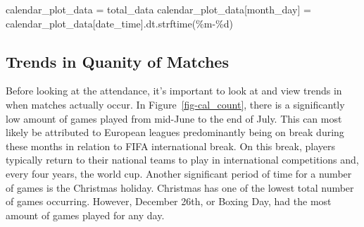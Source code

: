 \documentclass[
  letterpaper,
  DIV=11,
  numbers=noendperiod]{scrartcl}
\newenvironment{Shaded}{\begin{snugshade}}{\end{snugshade}}
\newcommand{\NormalTok}[1]{\textcolor[rgb]{0.00,0.23,0.31}{#1}}
\newcommand{\OperatorTok}[1]{\textcolor[rgb]{0.37,0.37,0.37}{#1}}
\newcommand{\SpecialCharTok}[1]{\textcolor[rgb]{0.37,0.37,0.37}{#1}}
\newcommand{\StringTok}[1]{\textcolor[rgb]{0.13,0.47,0.30}{#1}}
\begin{document}
\begin{Shaded}
\begin{Highlighting}[]
\NormalTok{calendar\_plot\_data }\OperatorTok{=}\NormalTok{ total\_data}
\NormalTok{calendar\_plot\_data[}\StringTok{\textquotesingle{}month\_day\textquotesingle{}}\NormalTok{] }\OperatorTok{=}\NormalTok{ calendar\_plot\_data[}\StringTok{\textquotesingle{}date\_time\textquotesingle{}}\NormalTok{].dt.strftime(}\StringTok{\textquotesingle{}\%m{-}}\SpecialCharTok{\%d}\StringTok{\textquotesingle{}}\NormalTok{)}
\end{Highlighting}
\end{Shaded}

\hypertarget{trends-in-quanity-of-matches}{%
\subsection{Trends in Quanity of
Matches}\label{trends-in-quanity-of-matches}}

Before looking at the attendance, it's important to look at and view
trends in when matches actually occur. In Figure~\ref{fig-cal_count},
there is a significantly low amount of games played from mid-June to the
end of July. This can most likely be attributed to European leagues
predominantly being on break during these months in relation to FIFA
international break. On this break, players typically return to their
national teams to play in international competitions and, every four
years, the world cup. Another significant period of time for a number of
games is the Christmas holiday. Christmas has one of the lowest total
number of games occurring. However, December 26th, or Boxing Day, had
the most amount of games played for any day.
\end{document}
